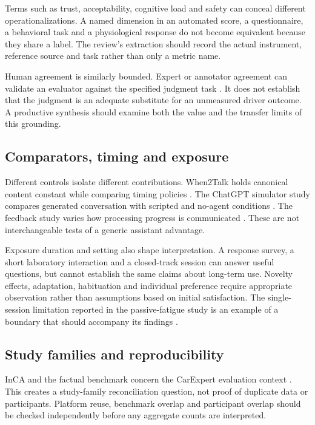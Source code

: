 \documentclass[11pt,a4paper]{article}
\begin{document}
Terms such as trust, acceptability, cognitive load and safety can
conceal different operationalizations. A named dimension in an automated
score, a questionnaire, a behavioral task and a physiological response
do not become equivalent because they share a label. The review's
extraction should record the actual instrument, reference source and
task rather than only a metric name.

Human agreement is similarly bounded. Expert or annotator agreement can
validate an evaluator against the specified judgment task
\citep{S14, S15, S16}. It does not establish that the judgment is an
adequate substitute for an unmeasured driver outcome. A productive
synthesis should examine both the value and the transfer limits of this
grounding.

\subsection{Comparators, timing and
exposure}\label{comparators-timing-and-exposure}

Different controls isolate different contributions. When2Talk holds
canonical content constant while comparing timing policies \citep{S13}.
The ChatGPT simulator study compares generated conversation with
scripted and no-agent conditions \citep{S4}. The feedback study varies
how processing progress is communicated \citep{S10}. These are not
interchangeable tests of a generic assistant advantage.

Exposure duration and setting also shape interpretation. A response
survey, a short laboratory interaction and a closed-track session can
answer useful questions, but cannot establish the same claims about
long-term use. Novelty effects, adaptation, habituation and individual
preference require appropriate observation rather than assumptions based
on initial satisfaction. The single-session limitation reported in the
passive-fatigue study is an example of a boundary that should accompany
its findings \citep{S5}.

\subsection{Study families and
reproducibility}\label{study-families-and-reproducibility}

InCA and the factual benchmark concern the CarExpert evaluation context
\citep{S14, S15}. This creates a study-family reconciliation question,
not proof of duplicate data or participants. Platform reuse, benchmark
overlap and participant overlap should be checked independently before
any aggregate counts are interpreted.
\end{document}

